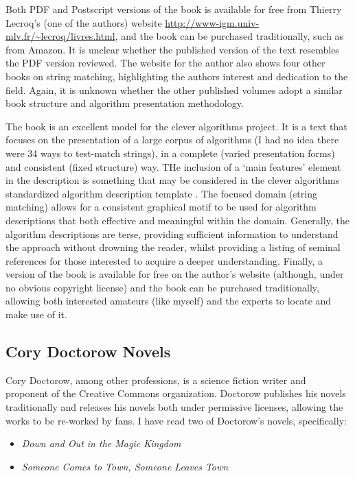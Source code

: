 \documentclass[a4paper, 11pt]{article}
\begin{document}
Both PDF and Postscript versions of the book is available for free from Thierry Lecroq's (one of the authors) website \url{http://www-igm.univ-mlv.fr/~lecroq/livres.html}, and the book can be purchased traditionally, such as from Amazon. It is unclear whether the published version of the text resembles the PDF version reviewed. The website for the author also shows four other books on string matching, highlighting the authors interest and dedication to the field. Again, it is unknown whether the other published volumes adopt a similar book structure and algorithm presentation methodology.

The book is an excellent model for the clever algorithms project. It is a text that focuses on the presentation of a large corpus of algorithms (I had no idea there were 34 ways to test-match strings), in a complete (varied presentation forms) and consistent (fixed structure) way. THe inclusion of a `main features' element in the description is something that may be considered in the clever algorithms standardized algorithm description template \cite{Brownlee2010a}. The focused domain (string matching) allows for a consistent graphical motif to be used for algorithm descriptions that both effective and meaningful within the domain. Generally, the algorithm descriptions are terse, providing sufficient information to understand the approach without drowning the reader, whilst providing a listing of seminal references for those interested to acquire a deeper understanding. Finally, a version of the book is available for free on the author's website (although, under no obvious copyright license) and the book can be purchased traditionally, allowing both interested amateurs (like myself) and the experts to locate and make use of it.

% 
% 
\subsection{Cory Doctorow Novels}
Cory Doctorow, among other professions, is a science fiction writer and proponent of the Creative Commons organization. Doctorow publishes his novels traditionally and releases his novels both under permissive licenses, allowing the works to be re-worked by fans. I have read two of Doctorow's novels, specifically: 

\begin{itemize}
	\item \emph{Down and Out in the Magic Kingdom} \cite{Doctorow2003}
	\item \emph{Someone Comes to Town, Someone Leaves Town} \cite{Doctorow2006}
\end{itemize}
\end{document}
